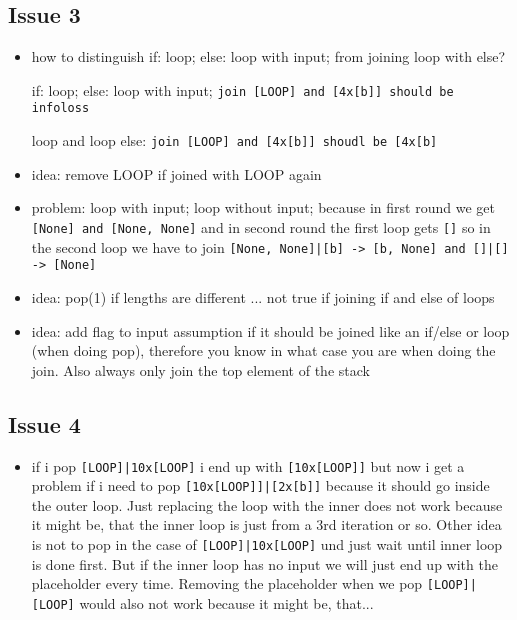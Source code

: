 \documentclass[11pt]{article}
\begin{document}
\subsection{Issue 3}
\begin{itemize}
\item how to distinguish if: loop; else: loop with input; from joining loop with else?

if: loop; else: loop with input; \verb/join [LOOP] and [4x[b]] should be infoloss/

loop and loop else: \verb/join [LOOP] and [4x[b]] shoudl be [4x[b]/

\item idea: remove LOOP if joined with LOOP again

\item problem: loop with input; loop without input; because in first round we get \verb/[None] and [None, None]/ and in second round the first loop gets \verb/[]/ so in the second loop we have to join \verb/[None, None]|[b] -> [b, None] and []|[] -> [None]/

\item idea: pop(1) if lengths are different ... not true if joining if and else of loops

\item idea: add flag to input assumption if it should be joined like an if/else or loop (when doing pop), therefore you know in what case you are when doing the join. Also always only join the top element of the stack

\end{itemize}

\subsection{Issue 4}
\begin{itemize}
\item if i pop \verb/[LOOP]|10x[LOOP]/ i end up with \verb/[10x[LOOP]]/ but now i get a problem if i need to pop \verb/[10x[LOOP]]|[2x[b]]/ because it should go inside the outer loop. Just replacing the loop with the inner does not work because it might be, that the inner loop is just from a 3rd iteration or so. Other idea is not to pop in the case of \verb/[LOOP]|10x[LOOP]/ und just wait until inner loop is done first. But if the inner loop has no input we will just end up with the placeholder every time. Removing the placeholder when we pop \verb/[LOOP]|[LOOP]/ would also not work because it might be, that...

\end{itemize}
\end{document}
